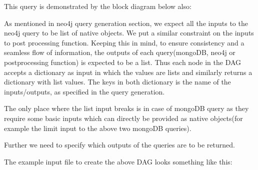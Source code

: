 \documentclass[letterpaper,10pt,english]{sphinxmanual}
\begin{document}
This query is demonstrated by the block diagram below also:

\noindent{}

As mentioned in neo4j query generation section, we expect all the inputs to the neo4j query to be  list of native objects. We put a similar constraint on the inputs to post processing function. Keeping this in mind, to ensure consistency and a seamless flow of information, the outputs of each query(mongoDB, neo4j or postprocessing function) is expected to be a list. Thus each node in the DAG accepts a dictionary as input in which the values are lists and similarly returns a dictionary with list values. The keys in both dictionary is the name of the inputs/outputs, as specified in the query generation.

The only place where the list input breaks is in case of mongoDB query as they require some basic inputs which can directly be provided as native objects(for example the limit input to the above two mongoDB queries).

Further we need to specify which outputs of the queries are to be returned.

The example input file to create the above DAG looks something like this:

%
\begin{sphinxVerbatim}[commandchars=\\\{\}]
 
 
 
 
 
\end{sphinxVerbatim}
\end{document}
